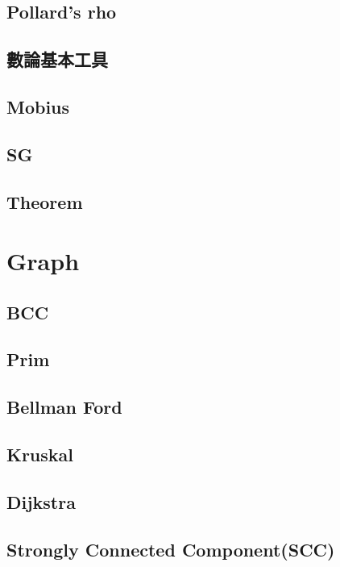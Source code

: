 \subsection{Pollard's rho}

\subsection{數論基本工具}

\subsection{Mobius}

\subsection{SG}

\subsection{Theorem}



\section{Graph}

\subsection{BCC}

\subsection{Prim}

\subsection{Bellman Ford}

\subsection{Kruskal}

\subsection{Dijkstra}

\subsection{Strongly Connected Component(SCC)}

